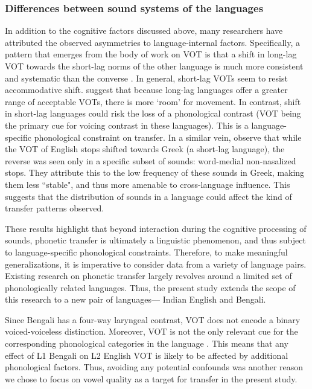 \documentclass[12 pt]{article}
\begin{document}
\subsubsection*{Differences between sound systems of the languages} \label{sound systems} In addition to the cognitive factors discussed above, many researchers have attributed the observed asymmetries to language-internal factors. Specifically, a pattern that emerges from the body of work on VOT is that a shift in long-lag VOT towards the short-lag norms of the other language is much more consistent and systematic than the converse \citep{tobin2017phonetic, olson2016role,bullock2009trying,antoniou2011inter,chang2012rapid}. In general, short-lag VOTs seem to resist accommodative shift. \cite{bullock2009trying} suggest that because long-lag languages offer a greater range of acceptable VOTs, there is more `room' for movement. In contrast, shift in short-lag languages could risk the loss of a phonological contrast (VOT being the primary cue for voicing contrast in these languages).  This is a language-specific phonological constraint on transfer.
In a similar vein, \cite{antoniou2011inter} observe that while the VOT of English stops shifted towards Greek (a short-lag language), the reverse was seen only in a specific subset of sounds: word-medial non-nasalized stops. They attribute this to the low frequency of these sounds in Greek, making them less ``stable", and thus more amenable to cross-language influence. This suggests that the distribution of sounds in a language could affect the kind of transfer patterns observed.

These results highlight that beyond interaction during the cognitive processing of sounds, phonetic transfer is ultimately a linguistic phenomenon, and thus subject to language-specific phonological constraints. Therefore, to make meaningful generalizations, it is imperative to consider data from a variety of language pairs. Existing research on phonetic transfer largely revolves around a limited set of phonologically related languages. Thus, the present study extends the scope of this research to a new pair of languages--- Indian English and Bengali.

Since Bengali has a four-way laryngeal contrast, VOT does not encode a binary voiced-voiceless distinction. Moreover, VOT is not the only relevant cue for the corresponding phonological categories in the language \citep{dmitrieva2020acoustic}. This means that any effect of L1 Bengali on L2 English VOT is likely to be affected by additional phonological factors. Thus, avoiding any potential confounds was another reason we chose to focus on vowel quality as a target for transfer in the present study. 
\end{document}
